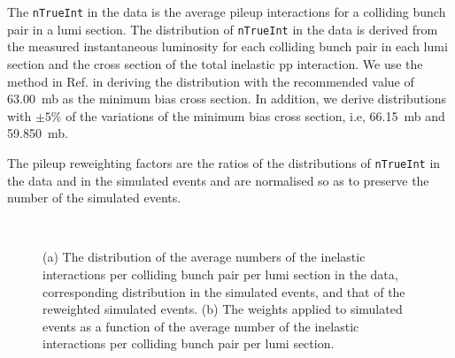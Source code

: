 The \verb!nTrueInt! in the data is the average pileup interactions for
a colliding bunch pair in a lumi section. The distribution of
\verb!nTrueInt! in the data is derived from the measured instantaneous
luminosity for each colliding bunch pair in each lumi section and the
cross section of the total inelastic pp interaction. We use the method
in Ref. \cite{twiki-PileupJSONFileforData} in deriving the
distribution with the recommended value of 63.00~mb as the minimum
bias cross section. In addition, we derive distributions with $\pm
5\%$ of the variations of the minimum bias cross section, i.e,
66.15~mb and 59.850~mb.

The pileup reweighting factors are the ratios of the distributions of
\verb!nTrueInt! in the data and in the simulated events and are
normalised so as to preserve the number of the simulated events.

\begin{figure}[h!]
  \centering
   ~
  \caption{(a) The distribution of the average numbers of the
    inelastic interactions per colliding bunch pair per lumi section
    in the data, corresponding distribution in the simulated events,
    and that of the reweighted simulated events. (b) The weights
    applied to simulated events as a function of the average number of
    the inelastic interactions per colliding bunch pair per lumi
    section.}
  \label{f044_corr_nTrueInt_data_mc_norm}
\end{figure}

